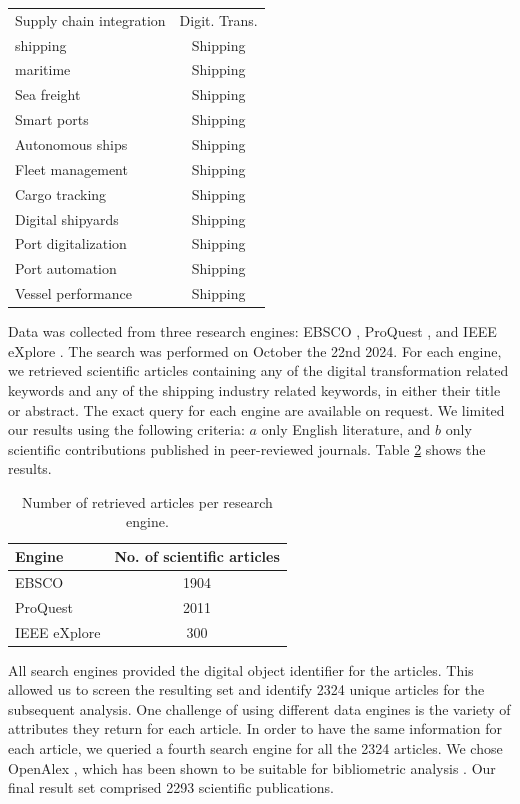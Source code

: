 \documentclass[a4paper, review, endfloat, authoryear]{elsarticle}
\begin{document}
\begin{table}[h]
\begin{tabular}{l c}
			Supply chain integration & Digit. Trans. \\
			shipping & Shipping \\
			maritime & Shipping \\
			Sea freight & Shipping \\
			Smart ports & Shipping \\
			Autonomous ships & Shipping \\
			Fleet management & Shipping \\
			Cargo tracking & Shipping \\
			Digital shipyards & Shipping \\
			Port digitalization & Shipping \\
			Port automation & Shipping \\
			Vessel performance & Shipping \\
			\hline
		\end{tabular}
		\label{tab:keywords}
	\end{table}
	
	Data was collected from three research engines: EBSCO \citep{vaughan2011ebsco}, ProQuest \citep{cooke2017proquest}, and IEEE eXplore \citep{wilde2016ieee}. The search was performed on October the 22nd 2024. For each engine, we retrieved scientific articles containing any of the digital transformation related keywords and any of the shipping industry related keywords, in either their title or abstract. The exact query for each engine are available on request. We limited our results using the following criteria: \(a\) only English literature, and \(b\) only scientific contributions published in peer-reviewed journals. Table \ref{tab:searchres} shows the results.
	
	\begin{table}[h]
		\centering
		\caption{Number of retrieved articles per research engine.}
		\begin{tabular}{l c}
			\hline
			Engine & No. of scientific articles \\
			\hline
			EBSCO & 1904 \\
			ProQuest & 2011 \\
			IEEE eXplore & 300 \\
			\hline
		\end{tabular}
		\label{tab:searchres}
	\end{table}
	
	All search engines provided the digital object identifier for the articles. This allowed us to screen the resulting set and identify 2324 unique articles for the subsequent analysis. One challenge of using different data engines is the variety of attributes they return for each article. In order to have the same information for each article, we queried a fourth search engine for all the 2324 articles. We chose OpenAlex \citep{priem2022openalex}, which has been shown to be suitable for bibliometric analysis \citep{alperin2024analysis}. Our final result set comprised 2293 scientific publications.
	
\end{document}

